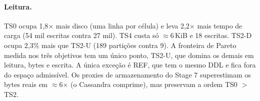 \paragraph{Leitura.} TS0 ocupa 1,8$\times$ mais disco (uma linha por célula) e leva 2,2$\times$ mais tempo de carga (54 mil escritas contra 27 mil). TS4 custa só $\approx$6\,KiB e 18 escritas. TS2-D ocupa 2,3\% mais que TS2-U (189 partições contra 9). A fronteira de Pareto medida nos três objetivos tem um único ponto, TS2-U, que domina os demais em leitura, bytes e escrita. A única exceção é REF, que tem o mesmo DDL e fica fora do espaço admissível. Os proxies de armazenamento do Stage 7 superestimam os bytes reais em $\approx$6$\times$ (o Cassandra comprime), mas preservam a ordem TS0 $>$ TS2.
